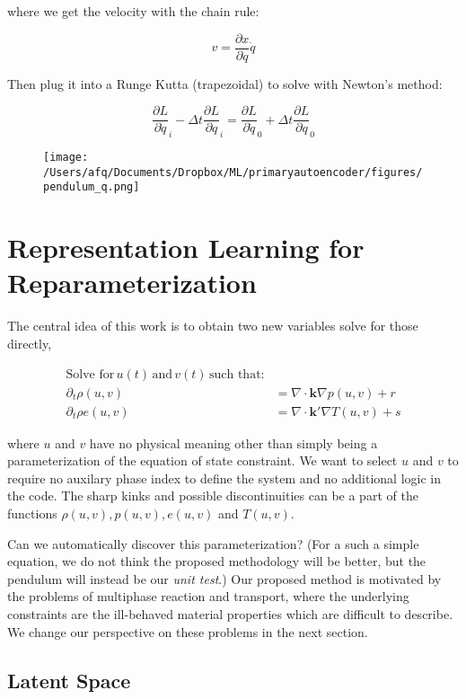 \documentclass[]{article}
\begin{document}
where we get the velocity with the chain rule:

\[v = \frac{\partial x}{\partial q} \dot{q}\]

Then plug it into a Runge Kutta (trapezoidal) to solve with Newton's
method:

\[\frac{\partial L}{\partial \dot{q}}_i - \Delta t \frac{\partial L}{\partial q}_i = \frac{\partial L}{\partial \dot{q}}_0 + \Delta t \frac{\partial L}{\partial q}_0\]

\begin{figure}
\centering
\texttt{[image: /Users/afq/Documents/Dropbox/ML/primaryautoencoder/figures/pendulum\_q.png]}
\caption{}
\end{figure}

\hypertarget{header-n3294}{%
\section{Representation Learning for
Reparameterization}\label{header-n3294}}

The central idea of this work is to obtain two new variables solve for
those directly,

\begin{align}
\text{Solve for}\, u(t)\, \text{and}\, v(t)\, \text{such that:}\\
\partial_t \rho(u,v) & = \nabla \cdot \mathbf{k} \nabla p(u,v) + r \\
\partial_t \rho e(u,v) & = \nabla \cdot \mathbf{k'}\nabla T(u,v) + s
\end{align}

where \(u\) and \(v\) have no physical meaning other than simply being a
parameterization of the equation of state constraint. We want to select
\(u\) and \(v\) to require no auxilary phase index to define the system
and no additional logic in the code. The sharp kinks and possible
discontinuities can be a part of the functions
\(\rho(u,v), p(u,v), e(u,v)\) and \(T(u,v)\).

Can we automatically discover this parameterization? (For a such a
simple equation, we do not think the proposed methodology will be
better, but the pendulum will instead be our \emph{unit test}.) Our
proposed method is motivated by the problems of multiphase reaction and
transport, where the underlying constraints are the ill-behaved material
properties which are difficult to describe. We change our perspective on
these problems in the next section.

\hypertarget{header-n3299}{%
\subsection{Latent Space}\label{header-n3299}}
\end{document}

